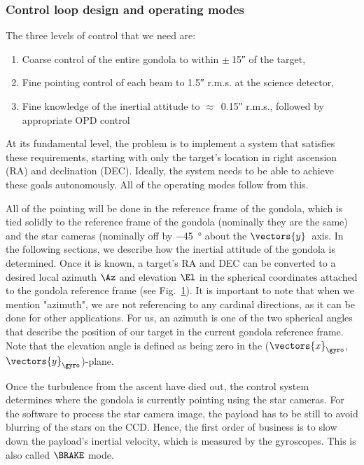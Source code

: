 \subsubsection{Control loop design and operating modes}

The three levels of control that we need are:
\begin{enumerate}
\item Coarse control of the entire gondola to within $\pm~$\ang{;;15} of the target,
\item Fine pointing control of each beam to \ang{;;1.5} r.m.s. at the science detector,
\item Fine knowledge of the inertial attitude to $\approx$~\ang{;;0.15} r.m.s., followed by appropriate OPD control
\end{enumerate}

At its fundamental level, the problem is to implement a system that satisfies these requirements, starting with only the target's location in right ascension (RA) and declination (DEC). Ideally, the system needs to be able to achieve these goals autonomously. All of the operating modes follow from this.

All of the pointing will be done in the reference frame of the gondola, which is tied solidly to the reference frame of the gondola (nominally they are the same) and the star cameras (nominally off by \SI{-45}{\degree} about the $\vectors{y}$~axis. In the following sections, we describe how the inertial attitude of the gondola is determined. Once it is known, a target's RA and DEC can be converted to a desired local azimuth $\Az$ and elevation $\El$ in the spherical coordinates attached to the gondola reference frame (see Fig.~\ref{fig:AzEl}). It is important to note that when we mention "azimuth", we are not referencing to any cardinal directions, as it can be done for other applications. For us, an azimuth is one of the two spherical angles that describe the position of our target in the current gondola reference frame. Note that the elevation angle is defined as being zero in the ($\vectors{x}_\gyro$,$\vectors{y}_\gyro$)-plane.

\begin{figure}[!ht]
	\centering
	
	\caption[Azimuth and elevation of a target]{}
	\label{fig:AzEl}
    \end{figure}


Once the turbulence from the ascent have died out, the control system determines where the gondola is currently pointing using the star cameras. For the software to process the star camera image, the payload has to be still to avoid blurring of the stars on the CCD. Hence, the first order of business is to slow down the payload's inertial velocity, which is measured by the gyroscopes. This is also called $\BRAKE$ mode.

